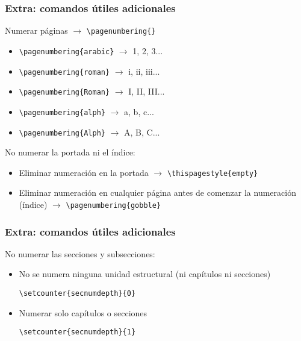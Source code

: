 \begin{frame}[fragile]
\frametitle{Extra: comandos útiles adicionales}

Numerar páginas $\rightarrow$ \verb|\pagenumbering{}|
\begin{itemize}
    \item \verb|\pagenumbering{arabic}| $\rightarrow$ 1, 2, 3...
    \item \verb|\pagenumbering{roman}| $\rightarrow$ i, ii, iii...
    \item \verb|\pagenumbering{Roman}| $\rightarrow$ I, II, III...
    \item \verb|\pagenumbering{alph}| $\rightarrow$ a, b, c...
    \item \verb|\pagenumbering{Alph}| $\rightarrow$ A, B, C...
\end{itemize}

\vspace{0.5cm}

No numerar la portada ni el índice:
\begin{itemize}
    \item Eliminar numeración en la portada $\rightarrow$ \verb|\thispagestyle{empty}|
    \item Eliminar numeración en cualquier página antes de comenzar la numeración (índice) $\rightarrow$ \verb|\pagenumbering{gobble}|
\end{itemize}

\end{frame}

\begin{frame}[fragile]
\frametitle{Extra: comandos útiles adicionales}
No numerar las secciones y subsecciones:
\begin{itemize}
    \item No se numera ninguna unidad estructural (ni capítulos ni secciones) 
    
    \hspace{0.2cm} \verb|\setcounter{secnumdepth}{0}|
    
    \item Numerar solo capítulos o secciones 
    
    \hspace{0.2cm} \verb|\setcounter{secnumdepth}{1}|
\end{itemize}

\end{frame}